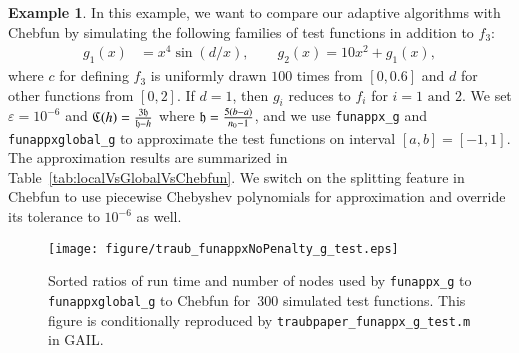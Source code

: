 \documentclass[review]{elsarticle}
\newcommand{\abstol}{\varepsilon}
\theoremstyle{definition}
\newtheorem{exmp}{Example}
\newcommand{\funappxg}{\texttt{funappx\_g}\xspace}
\newcommand{\funappxglobalg}{\texttt{funappxglobal\_g\xspace}}
\begin{document}
\begin{exmp}
In this example, we want to compare our adaptive algorithms with Chebfun by
simulating the following families of test functions in addition to $f_3$:
%
\begin{align*}
 g_1(x) &= x^4 \sin(d/x), \qquad
 g_2(x) = 10  x^2 + g_1(x),
\end{align*}
where $c$ for defining $f_3$ is uniformly drawn $100$ times from $[0,0.6]$ and
$d$ for other functions from $[0,2]$. If $d=1$, then  $g_i$ reduces to $f_i$ for
$i=1 \mbox{ and } 2$. 
We set $\abstol = 10^{-6}$ and $\mathfrak{C}
(h) = \frac{ 3 \mathfrak{h}}{\mathfrak{h}-h}$ where $\mathfrak{h} = \frac{5(b-a)}{n_0-1}$, and we use
\texttt{funappx\_g} and \texttt{funappxglobal\_g} to approximate the test
functions on interval $[a,b]=[-1,1]$. The approximation results are
summarized in Table~\ref{tab:localVsGlobalVsChebfun}. We switch on the splitting
feature in Chebfun to use piecewise Chebyshev polynomials for approximation and override its tolerance to $10^{-6}$ as well.

%
\begin{figure}[th]
  \centering
\texttt{[image: figure/traub\_funappxNoPenalty\_g\_test.eps]}
\caption{Sorted ratios of run time and number of nodes
used by \funappxg{} to \funappxglobalg{} to Chebfun for~300 simulated test
functions. This figure is conditionally reproduced by
\texttt{traubpaper\_funappx\_g\_test.m} in GAIL.}
  \label{fig:testfunctions}
\end{figure}


\end{exmp}
\end{document}

